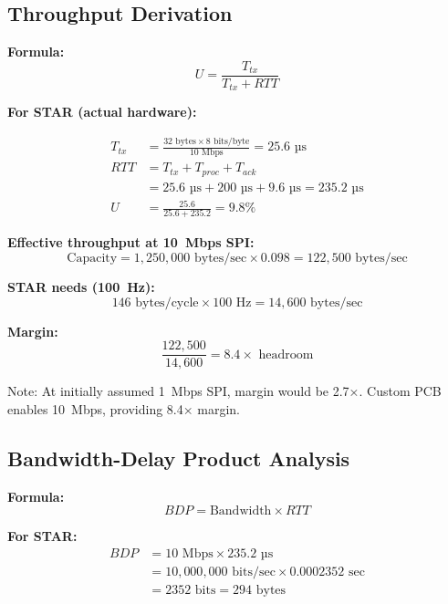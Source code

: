 \documentclass[12pt,letterpaper]{article}
\begin{document}
\subsection{Throughput Derivation}

\textbf{Formula:}
\begin{equation}
U = \frac{T_{tx}}{T_{tx} + RTT}
\end{equation}

\textbf{For STAR (actual hardware):}

\begin{align}
T_{tx} &= \frac{32 \text{ bytes} \times 8 \text{ bits/byte}}{10 \text{ Mbps}} = 25.6 \text{ µs} \\
RTT &= T_{tx} + T_{proc} + T_{ack} \\
    &= 25.6 \text{ µs} + 200 \text{ µs} + 9.6 \text{ µs} = 235.2 \text{ µs} \\
U &= \frac{25.6}{25.6 + 235.2} = 9.8\%
\end{align}

\textbf{Effective throughput at 10~Mbps SPI:}
\begin{equation}
\text{Capacity} = 1,250,000 \text{ bytes/sec} \times 0.098 = 122,500 \text{ bytes/sec}
\end{equation}

\textbf{STAR needs (100~Hz):}
\begin{equation}
146 \text{ bytes/cycle} \times 100 \text{ Hz} = 14,600 \text{ bytes/sec}
\end{equation}

\textbf{Margin:}
\begin{equation}
\frac{122,500}{14,600} = 8.4× \text{ headroom}
\end{equation}

Note: At initially assumed 1~Mbps SPI, margin would be 2.7×. Custom PCB enables 10~Mbps, providing 8.4× margin.

\subsection{Bandwidth-Delay Product Analysis}

\textbf{Formula:}
\begin{equation}
BDP = \text{Bandwidth} \times RTT
\end{equation}

\textbf{For STAR:}
\begin{align}
BDP &= 10 \text{ Mbps} \times 235.2 \text{ µs} \\
    &= 10,000,000 \text{ bits/sec} \times 0.0002352 \text{ sec} \\
    &= 2352 \text{ bits} = 294 \text{ bytes}
\end{align}
\end{document}
